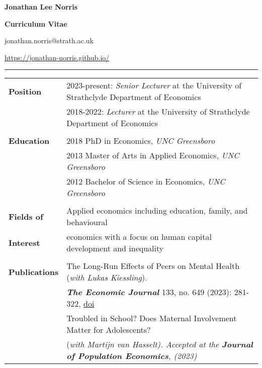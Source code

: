 \documentclass[11pt,a4paper]{article}
\begin{document}
	
\begin{center}

\textsf{{\Large\textbf{Jonathan Lee Norris}}}		
\smallskip	
	
\textsf{{\Large \textbf{Curriculum Vitae}}} 
\smallskip
	
\textsf{jonathan.norris@strath.ac.uk}

\textsf{\url{https://jonathan-norris.github.io/}}	
\end{center}	
	\hrule height 1pt

\bigskip

\begin{longtable}{l l}
\textbf{Position}          &  2023-present: \textit{Senior Lecturer} at the University of Strathclyde Department of Economics \\
																			 &  2018-2022: \textit{Lecturer} at the University of Strathclyde Department of Economics  \\
                                       &  \\
\textbf{Education}      &   2018 PhD in Economics, \textit{UNC Greensboro}	  \\
																			 &   2013 Master of Arts in Applied Economics, \textit{UNC Greensboro}    \\
																			 &   2012 Bachelor of Science in Economics, \textit{UNC Greensboro}	   \\
																			 &   \\ 
\textbf{Fields of}         &   Applied economics including education, family, and behavioural   \\ 
\textbf{Interest}           &   economics with a focus on human capital development and inequality \\ 
																			 &   \\
\textbf{Publications}   &  The Long-Run Effects of Peers on Mental Health (\textit{with Lukas Kiessling}).     \\
																				&  \textbf{\textit{The Economic Journal}} 133, no. 649 (2023): 281-322, \href{https://doi.org/10.1093/ej/ueac039}{doi}  \\ 
\addlinespace
																				&  Troubled in School? Does Maternal Involvement Matter for Adolescents?  \\
																				&  (\textit{with Martijn van Hasselt). Accepted at the \textbf{\textit{Journal of Population Economics}}, (2023)  \\
\addlinespace
}
\end{longtable}
\end{document}
